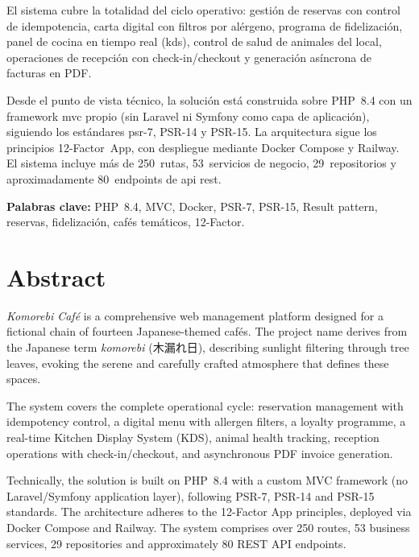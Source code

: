 \documentclass[12pt,a4paper,twoside,openright]{report}
\begin{document}
El sistema cubre la totalidad del ciclo operativo: gestión de reservas con control de
idempotencia, carta digital con filtros por alérgeno, programa de fidelización, panel de
cocina en tiempo real (\gls{kds}), control de salud de animales del local, operaciones de
recepción con check-in/checkout y generación asíncrona de facturas en PDF.

Desde el punto de vista técnico, la solución está construida sobre PHP~8.4 con un
framework \gls{mvc} propio (sin Laravel ni Symfony como capa de aplicación), siguiendo
los estándares \gls{psr}-7, PSR-14 y PSR-15. La arquitectura sigue los principios
12-Factor~App, con despliegue mediante Docker Compose y Railway. El sistema incluye
más de 250~rutas, 53~servicios de negocio, 29~repositorios y aproximadamente
80~endpoints de \gls{api} \gls{rest}.

\bigskip
\textbf{Palabras clave:} PHP~8.4, MVC, Docker, PSR-7, PSR-15, Result pattern,
reservas, fidelización, cafés temáticos, 12-Factor.

\vspace{2cm}

\chapter*{Abstract}

\textit{Komorebi Café} is a comprehensive web management platform designed for a
fictional chain of fourteen Japanese-themed cafés. The project name derives from the
Japanese term \textit{komorebi} (木漏れ日), describing sunlight filtering through tree
leaves, evoking the serene and carefully crafted atmosphere that defines these spaces.

The system covers the complete operational cycle: reservation management with idempotency
control, a digital menu with allergen filters, a loyalty programme, a real-time Kitchen
Display System (KDS), animal health tracking, reception operations with check-in/checkout,
and asynchronous PDF invoice generation.

Technically, the solution is built on PHP~8.4 with a custom MVC framework (no
Laravel/Symfony application layer), following PSR-7, PSR-14 and PSR-15 standards.
The architecture adheres to the 12-Factor App principles, deployed via Docker Compose
and Railway. The system comprises over 250 routes, 53 business services, 29 repositories
and approximately 80 REST API endpoints.
\end{document}
